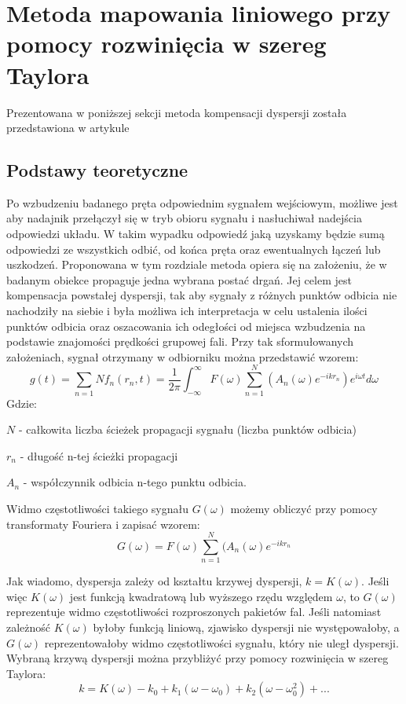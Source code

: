 
\section{Metoda mapowania liniowego przy pomocy rozwinięcia w szereg Taylora}
\label{sec:Taylor}
Prezentowana w poniższej sekcji metoda kompensacji dyspersji została przedstawiona w artykule \cite{kasia5}
\subsection{Podstawy teoretyczne}
Po wzbudzeniu badanego pręta odpowiednim sygnałem wejściowym, możliwe jest aby nadajnik przełączył się w tryb obioru sygnału i nasłuchiwał nadejścia odpowiedzi układu. W takim wypadku odpowiedź jaką uzyskamy będzie sumą odpowiedzi ze wszystkich odbić, od końca pręta oraz ewentualnych łączeń lub uszkodzeń.  Proponowana w tym rozdziale metoda opiera się na założeniu, że w badanym obiekce propaguje jedna wybrana postać drgań. Jej celem jest kompensacja powstałej dyspersji, tak aby sygnały z różnych punktów odbicia nie nachodziły na siebie i była możliwa ich interpretacja w celu ustalenia ilości punktów odbicia oraz oszacowania ich odegłości od miejsca wzbudzenia na podstawie znajomości prędkości grupowej fali. Przy tak sformułowanych założeniach, sygnał otrzymany w odbiorniku można przedstawić wzorem:
\begin{equation}
g(t) = \sum\limits_{n=1}{N}f_n(r_n,t)=\frac{1}{2\pi}\int _{-\infty}^{\infty}F(\omega)\sum\limits_{n=1}^{N}(A_n(\omega)e^{-ikr_n})e^{i\omega t} d\omega \label{eq:g(t)_taylor}
\end{equation}
Gdzie:

$N$ - całkowita liczba ścieżek propagacji sygnału (liczba punktów odbicia)

$r_n$ - długość n-tej ścieżki propagacji

$A_n$ - współczynnik odbicia n-tego punktu odbicia.

Widmo częstotliwości takiego sygnału $G(\omega)$  możemy obliczyć przy pomocy transformaty Fouriera i zapisać wzorem:
\begin{equation}
G(\omega) = F(\omega)\sum\limits_{n=1}^{N}(A_n(\omega)e^{-ikr_n} \label{eq:G(omega)_taylor}
\end{equation}

Jak wiadomo, dyspersja zależy od kształtu krzywej dyspersji, $k = K(\omega)$. Jeśli więc $K(\omega)$ jest funkcją kwadratową lub wyższego rzędu względem $\omega$, to $G(\omega)$ reprezentuje widmo częstotliwości rozproszonych pakietów fal. Jeśli natomiast zależność $K(\omega)$ byłoby funkcją liniową, zjawisko dyspersji nie występowałoby, a $G(\omega)$ reprezentowałoby widmo częstotliwości sygnału, który nie uległ dyspersji. 
Wybraną krzywą dyspersji można przybliżyć przy pomocy rozwinięcia w szereg Taylora:
\begin{equation}
k = K(\omega) - k_0+k_1(\omega - \omega _0) + k_2(\omega - \omega _0^2)+... \label{eq:szereg_k}
\end{equation}

